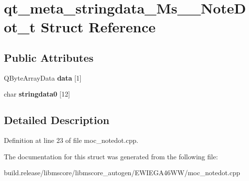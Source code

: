 \hypertarget{structqt__meta__stringdata___ms_____note_dot__t}{}\section{qt\+\_\+meta\+\_\+stringdata\+\_\+\+Ms\+\_\+\+\_\+\+Note\+Dot\+\_\+t Struct Reference}
\label{structqt__meta__stringdata___ms_____note_dot__t}
\subsection*{Public Attributes}
\begin{DoxyCompactItemize}
\item 
\mbox{\label{structqt__meta__stringdata___ms_____note_dot__t_ab372a392d9122899ef029a1efecda2c0}} 
Q\+Byte\+Array\+Data {\bfseries data} \mbox{[}1\mbox{]}
\item 
\mbox{\label{structqt__meta__stringdata___ms_____note_dot__t_a8bdb79c96d96b51198273482067eb038}} 
char {\bfseries stringdata0} \mbox{[}12\mbox{]}
\end{DoxyCompactItemize}


\subsection{Detailed Description}


Definition at line 23 of file moc\+\_\+notedot.\+cpp.



The documentation for this struct was generated from the following file\+:\begin{DoxyCompactItemize}
\item 
build.\+release/libmscore/libmscore\+\_\+autogen/\+E\+W\+I\+E\+G\+A46\+W\+W/moc\+\_\+notedot.\+cpp\end{DoxyCompactItemize}
